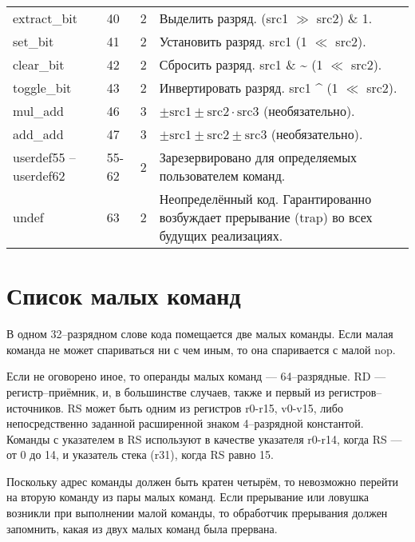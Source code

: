 \documentclass[forwardcom.tex]{subfiles}
\begin{document}
\begin{longtable} {|p{18mm}|p{9mm}|p{21mm}|p{95mm}|}
extract\_bit      & 40           & 2                                & Выделить разряд. (src1 $\gg$ src2) \& 1. \\
set\_bit          & 41           & 2                                & Установить разряд. src1 \textbar{} (1 $\ll$ src2). \\
clear\_bit        & 42           & 2                                & Сбросить разряд. src1 \& \~{} (1 $\ll$ src2). \\
toggle\_bit       & 43           & 2                                & Инвертировать разряд. src1 \^{} (1 $\ll$ src2). \\
mul\_add          & 46           & 3                                & $\pm \text{src1} \pm \text{src2} \cdot \text{src3}$ (необязательно). \\
add\_add          & 47           & 3                                & $\pm \text{src1} \pm \text{src2} \pm \text{src3}$ (необязательно). \\
userdef55 -- userdef62 & 55-62 & 2 & Зарезервировано для определяемых пользователем команд. \\
undef             & 63           & 2                                & Неопределённый код. Гарантированно возбуждает прерывание (trap)  во всех будущих реализациях. \\ \hline
\end{longtable}

\section{Список малых команд}
В одном 32--разрядном слове кода помещается две малых команды. Если малая команда не может спариваться ни с чем иным, то она спаривается с малой nop.

Если не оговорено иное, то операнды малых команд --- 64--разрядные. RD --- регистр--приёмник, и, в большинстве случаев, также и первый из регистров--источников. RS может быть одним из регистров r0-r15, v0-v15, либо непосредственно заданной расширенной знаком 4--разрядной константой. Команды с указателем в RS используют в качестве указателя r0-r14, когда RS --- от 0 до 14, и указатель стека (r31), когда RS равно 15.

Поскольку адрес команды должен быть кратен четырём, то невозможно перейти на вторую команду из пары малых команд. Если прерывание или ловушка возникли при выполнении малой команды, то обработчик прерывания должен запомнить, какая из двух малых команд была прервана.
\end{document}

